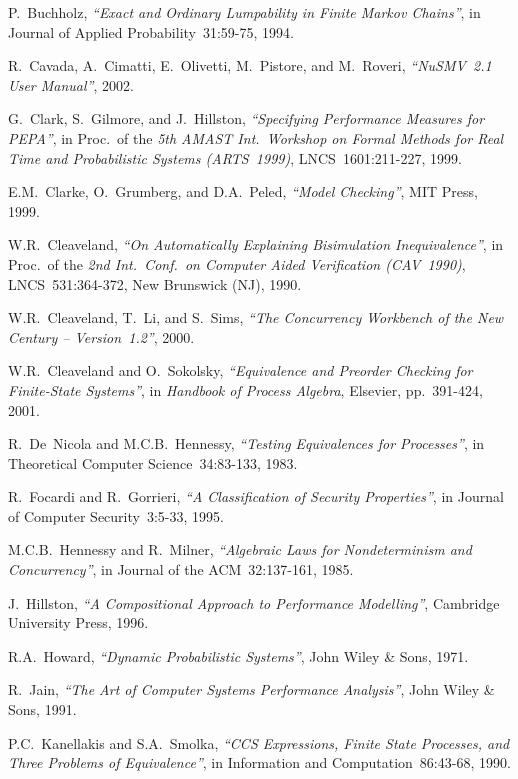 \begin{thebibliography}{00}
 P.~Buchholz,
{\it ``Exact and Ordinary Lumpability in Finite Markov Chains''},
in Journal of Applied Probability~31:59-75, 1994.

 R.~Cavada, A.~Cimatti, E.~Olivetti, M.~Pistore, and M.~Roveri,
{\it ``NuSMV~2.1 User Manual''},
2002.

 G.~Clark, S.~Gilmore, and J.~Hillston,
{\it ``Specifying Performance Measures for PEPA''},
in Proc.\ of the {\it 5th AMAST Int.\ Workshop on Formal Methods for Real Time and Probabilistic Systems
(ARTS~1999)},
LNCS~1601:211-227, 1999.

 E.M.~Clarke, O.~Grumberg, and D.A.~Peled,
{\it ``Model Checking''},
MIT Press, 1999.

 W.R.~Cleaveland,
{\it ``On Automatically Explaining Bisimulation Inequivalence''},
in Proc.\ of the {\it 2nd Int.\ Conf.\ on Computer Aided Verification (CAV~1990)},
LNCS~531:364-372,
New Brunswick (NJ), 1990.

 W.R.~Cleaveland, T.~Li, and S.~Sims,
{\it ``The Concurrency Workbench of the New Century -- Version~1.2''},
2000.

 W.R.~Cleaveland and O.~Sokolsky,
{\it ``Equivalence and Preorder Checking for Finite-State Systems''},
in {\it Handbook of Process Algebra},
Elsevier, pp.~391-424, 2001.

 R.~De~Nicola and M.C.B.~Hennessy,
{\it ``Testing Equivalences for Processes''},
in Theoretical Computer Science~34:83-133, 1983.

 R.~Focardi and R.~Gorrieri,
{\it ``A Classification of Security Properties''},
in Journal of Computer Security~3:5-33, 1995.

 M.C.B.~Hennessy and R.~Milner,
{\it ``Algebraic Laws for Nondeterminism and Concurrency''},
in Journal of the ACM~32:137-161, 1985.

 J.~Hillston,
{\it ``A Compositional Approach to Performance Modelling''},
Cambridge University Press, 1996.

 R.A.~Howard,
{\it ``Dynamic Probabilistic Systems''},
John Wiley \& Sons, 1971.

 R.~Jain,
{\it ``The Art of Computer Systems Performance Analysis''},
John Wiley \& Sons, 1991.

 P.C.~Kanellakis and S.A.~Smolka,
{\it ``CCS Expressions, Finite State Processes, and Three Problems of Equivalence''},
in Information and Computation~86:43-68, 1990.


\end{thebibliography}
